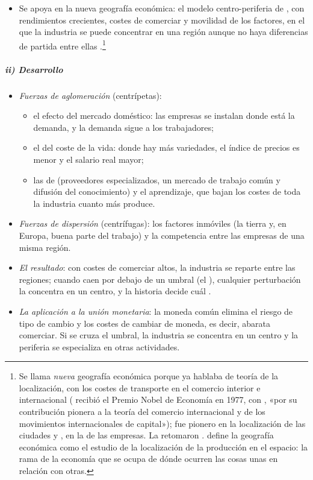 \documentclass[11pt]{article}
\begin{document}
\begin{itemize}
\item Se apoya en la nueva geografía económica: el modelo centro-periferia de \textcite{Krugman1991Increasing}, con rendimientos crecientes, costes de comerciar y movilidad de los factores, en el que la industria se puede concentrar en una región aunque no haya diferencias de partida entre ellas .\footnote{Se llama \emph{nueva} geografía económica porque \textcite{Ohlin1933Interregional} ya hablaba de teoría de la localización, con los costes de transporte en el comercio interior e internacional ( recibió el Premio Nobel de Economía en 1977, con , «por su contribución pionera a la teoría del comercio internacional y de los movimientos internacionales de capital»\nocite{Nobel1977MeadeOhlin});  fue pionero en la localización de las ciudades y , en la de las empresas. La retomaron \textcite{FujitaKrugmanVenables1999Spatial}. \textcite{Krugman1991Increasing} define la geografía económica como el estudio de la localización de la producción en el espacio: la rama de la economía que se ocupa de dónde ocurren las cosas unas en relación con otras.}
\end{itemize}

\subparagraph{ii) Desarrollo}

\begin{itemize}
\item \emph{Fuerzas de aglomeración} (centrípetas):
  \begin{itemize}
  \item el efecto del mercado doméstico: las empresas se instalan donde está la demanda, y la demanda sigue a los trabajadores;
  \item el del coste de la vida: donde hay más variedades, el índice de precios es menor y el salario real mayor;
  \item las  de  (proveedores especializados, un mercado de trabajo común y difusión del conocimiento) y el aprendizaje, que bajan los costes de toda la industria cuanto más produce.
  \end{itemize}
\item \emph{Fuerzas de dispersión} (centrífugas): los factores inmóviles (la tierra y, en Europa, buena parte del trabajo) y la competencia entre las empresas de una misma región.
\item \emph{El resultado}: con costes de comerciar altos, la industria se reparte entre las regiones; cuando caen por debajo de un umbral (el ), cualquier perturbación la concentra en un centro, y la historia decide cuál .
\item \emph{La aplicación a la unión monetaria}: la moneda común elimina el riesgo de tipo de cambio y los costes de cambiar de moneda, es decir, abarata comerciar. Si se cruza el umbral, la industria se concentra en un centro y la periferia se especializa en otras actividades.
\end{itemize}
\end{document}
